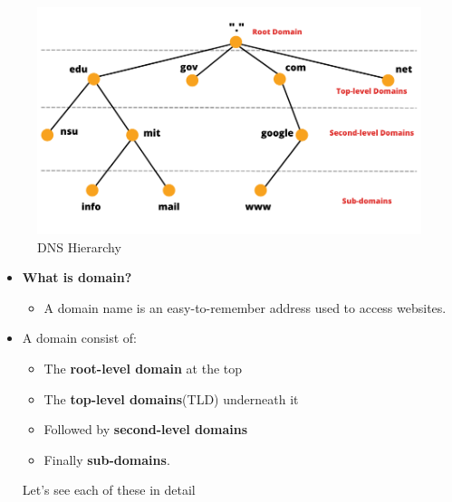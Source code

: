 
\begin{flushleft}
	\bigskip
	\begin{figure}[h!]
		\centering
		\includegraphics[scale=.6]{content/chapter3/images/dns.png}
		\caption{DNS Hierarchy}
		\label{fig:dns_heir}
	\end{figure}
	\begin{itemize}
		\item \textbf{What is domain?}
		\begin{itemize}
			\item A domain name is an easy-to-remember address used to access websites. 
		\end{itemize}
		\item A domain consist of:
		\begin{itemize}
			\item The \textbf{root-level domain} at the top
			\item The \textbf{top-level domains}(TLD) underneath it
			\item Followed by \textbf{second-level domains}
			\item Finally \textbf{sub-domains}.
		\end{itemize}
		Let's see each of these in detail

		\newpage
		

\end{itemize}
\end{flushleft}
